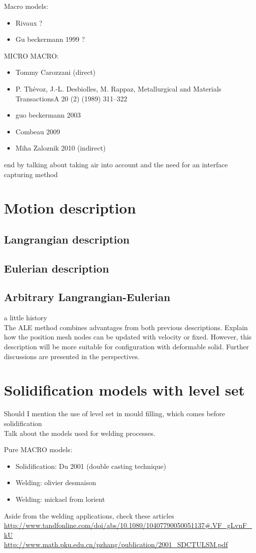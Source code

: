Macro models:
\begin{itemize}
\item Rivaux ?
\item Gu beckermann 1999 ?
\end{itemize}
MICRO MACRO: 
\begin{itemize}
\item Tommy Carozzani (direct)
\item P. Thévoz, J.-L. Desbiolles, M. Rappaz, Metallurgical and Materials TransactionsA 20 (2) (1989) 311–322
\item guo  beckermann 2003
\item Combeau 2009
\item Miha Zaloznik 2010 (indirect)
\end{itemize}
end by talking about taking air into account and the need for an interface capturing method
\section{Motion description}
\subsection{Langrangian description}
\subsection{Eulerian description}
\subsection{Arbitrary Langrangian-Eulerian}
a little history \citep{hirt_arbitrary_1971} \\ 
The ALE method combines advantages from both previous descriptions. Explain how the position mesh nodes can be
updated with velocity or fixed. However, this description will be more suitable for configuration with deformable solid. 
Further discussions are presented in the perspectives.

\section{Solidification models with level set}
Should I mention the use of level set in mould filling, which comes before solidification \\
Talk about the models used for welding processes. 

Pure MACRO models:
\begin{itemize}
\item Solidification: Du 2001 (double casting technique)
\item Welding: olivier desmaison
\item Welding: mickael from lorient 
\end{itemize}
Aside from the welding applications, check these articles
\url{http://www.tandfonline.com/doi/abs/10.1080/10407790050051137#.VF_gLvnF_kU} \\
\url{http://www.math.pku.edu.cn/pzhang/publication/2001_SDCTULSM.pdf}

